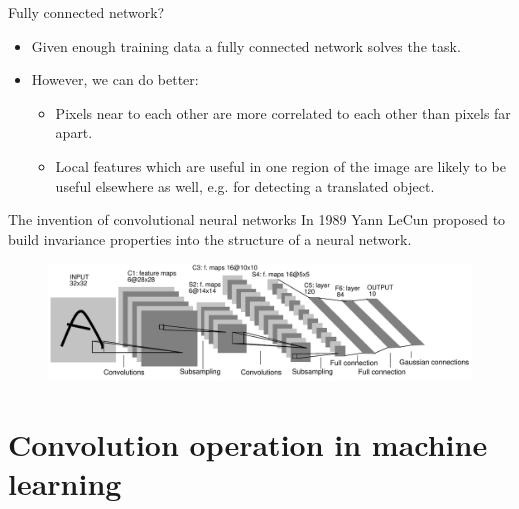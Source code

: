 \documentclass{beamer}
\begin{document}
	\begin{frame}{Fully connected network?}
	\begin{itemize}
		\item Given enough training data a fully connected network solves the task. %
		\item However, we can do better: %
		\begin{itemize}
			\item Pixels near to each other are more correlated to each other than pixels far apart. %
			\item Local features which are useful in one region of the image are likely to be useful elsewhere as well, e.g. for detecting a translated object.
		\end{itemize} %
	\end{itemize} 
	\end{frame}

    \begin{frame}{The invention of convolutional neural networks}
        In 1989 Yann LeCun proposed to build invariance properties into the structure of a neural network. 
				\begin{figure}%
				\centering
				\includegraphics[width=1.0\linewidth]{figures/lenet5.pdf}
				\end{figure}   
    \end{frame}
		
    \section{Convolution operation in machine learning}
\end{document}
